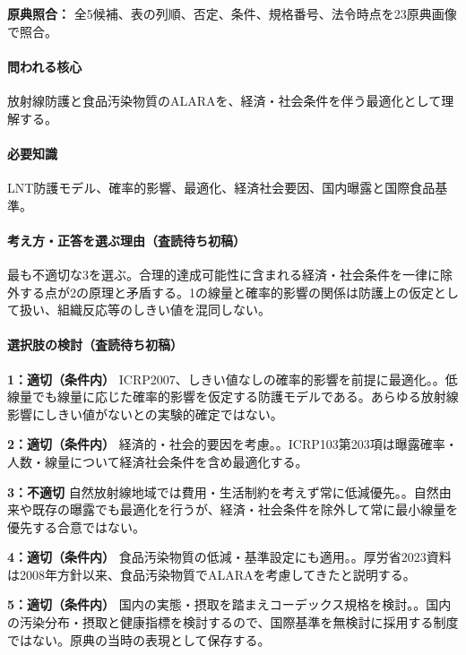 \noindent\textbf{原典照合：} 全5候補、表の列順、否定、条件、規格番号、法令時点を23原典画像で照合。\par

\paragraph{問われる核心} 放射線防護と食品汚染物質のALARAを、経済・社会条件を伴う最適化として理解する。

\paragraph{必要知識} LNT防護モデル、確率的影響、最適化、経済社会要因、国内曝露と国際食品基準。

\paragraph{考え方・正答を選ぶ理由（査読待ち初稿）} 最も不適切な3を選ぶ。合理的達成可能性に含まれる経済・社会条件を一律に除外する点が2の原理と矛盾する。1の線量と確率的影響の関係は防護上の仮定として扱い、組織反応等のしきい値を混同しない。

\paragraph{選択肢の検討（査読待ち初稿）}\mbox{}\par

\noindent\textbf{1：適切（条件内）} ICRP2007、しきい値なしの確率的影響を前提に最適化。。低線量でも線量に応じた確率的影響を仮定する防護モデルである。あらゆる放射線影響にしきい値がないとの実験的確定ではない。\par

\noindent\textbf{2：適切（条件内）} 経済的・社会的要因を考慮。。ICRP103第203項は曝露確率・人数・線量について経済社会条件を含め最適化する。\par

\noindent\textbf{3：不適切} 自然放射線地域では費用・生活制約を考えず常に低減優先。。自然由来や既存の曝露でも最適化を行うが、経済・社会条件を除外して常に最小線量を優先する合意ではない。\par

\noindent\textbf{4：適切（条件内）} 食品汚染物質の低減・基準設定にも適用。。厚労省2023資料は2008年方針以来、食品汚染物質でALARAを考慮してきたと説明する。\par

\noindent\textbf{5：適切（条件内）} 国内の実態・摂取を踏まえコーデックス規格を検討。。国内の汚染分布・摂取と健康指標を検討するので、国際基準を無検討に採用する制度ではない。原典の当時の表現として保存する。\par

